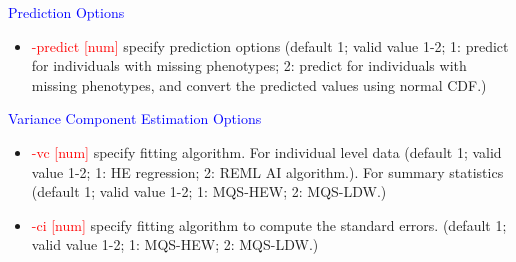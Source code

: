 \documentclass[11pt]{article}
\begin{document}
%
\textcolor{blue}{Prediction Options}
%
\begin{itemize}
\item  \textcolor{red}{-predict       [num]}     \quad          specify prediction options (default 1; valid value 1-2; 1: predict for individuals with missing phenotypes; 2: predict for individuals with missing phenotypes, and convert the predicted values using normal CDF.)
\end{itemize}
%
\textcolor{blue}{Variance Component Estimation Options}
%
\begin{itemize}
\item  \textcolor{red}{-vc       [num]}     \quad          specify fitting algorithm. For individual level data (default 1; valid value 1-2; 1: HE regression; 2: REML AI algorithm.). For summary statistics (default 1; valid value 1-2; 1: MQS-HEW; 2: MQS-LDW.)
\item  \textcolor{red}{-ci       [num]}     \quad          specify fitting algorithm to compute the standard errors. (default 1; valid value 1-2; 1: MQS-HEW; 2: MQS-LDW.)
\end{itemize}
%

\clearpage



\end{document}
